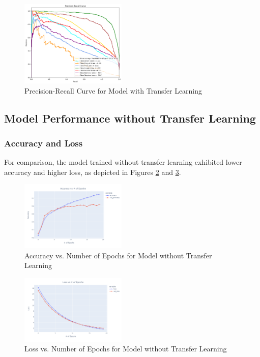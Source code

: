 \documentclass[conference]{IEEEtran}
\begin{document}
\begin{figure}[H]
    \centering
    \includegraphics[width=0.45\textwidth]{Figures/Precision-recall curve.png}
    \caption{Precision-Recall Curve for Model with Transfer Learning}
    \label{fig:prec_recall_tl}
\end{figure}

\subsection{Model Performance without Transfer Learning}


\subsubsection{Accuracy and Loss}
For comparison, the model trained without transfer learning exhibited lower accuracy and higher loss, as depicted in Figures \ref{fig:accuracy_no_tl} and \ref{fig:loss_no_tl}.

\begin{figure}[H]
    \centering
    \includegraphics[width=0.45\textwidth]{Figures/acurracy vs numepochs - no TL.png}
    \caption{Accuracy vs. Number of Epochs for Model without Transfer Learning}
    \label{fig:accuracy_no_tl}
\end{figure}

\begin{figure}[H]
    \centering
    \includegraphics[width=0.45\textwidth]{Figures/loss vs numepochs - no TL.png}
    \caption{Loss vs. Number of Epochs for Model without Transfer Learning}
    \label{fig:loss_no_tl}
\end{figure}
\end{document}
